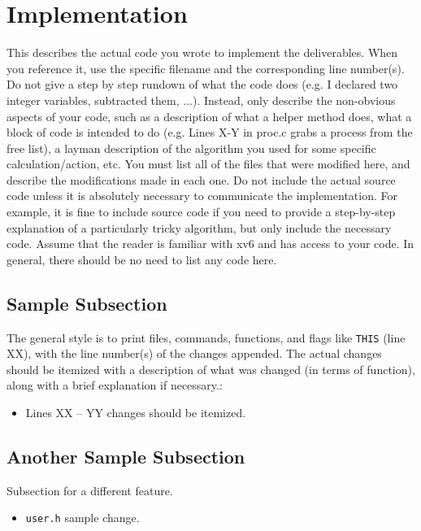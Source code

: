 \documentclass[11pt,letterpaper]{report}
\begin{document}
	\section*{Implementation}
	This describes the actual code you wrote to implement the deliverables. When you reference it, use the specific filename and the corresponding line number(s). Do not give a step by step rundown of what the code does (e.g. I declared two integer variables, subtracted them, ...). Instead, only describe the non-obvious aspects of your code, such as a description of what a helper method does, what a block of code is intended to do (e.g. Lines X-Y in proc.c grabs a process from the free list), a layman description of the algorithm you used for some specific calculation/action, etc. You must list all of the files that were modified here, and describe the modifications made in each one. Do not include the actual source code unless it is absolutely necessary to communicate the implementation. For example, it is fine to include source code if you need to provide a step-by-step explanation of a particularly tricky algorithm, but only include the necessary code. Assume that the reader is familiar with xv6 and has access to your code. In general, there should be no need to list any code here.


	\subsection*{Sample Subsection}
	The general style is to print files, commands, functions, and flags like {\tt THIS} ({\color{red}line XX}), with the line number(s) of the changes appended. The actual changes should be itemized with a description of what was changed (in terms of function), along with a brief explanation if necessary.:
	\begin{itemize}

	\item {\color{red}Lines XX -- YY} changes should be itemized.

	\end{itemize}

	\subsection*{Another Sample Subsection}
	Subsection for a different feature.

	\begin{itemize}

	\item {\tt user.h} sample change.
	\end{itemize}
\end{document}
